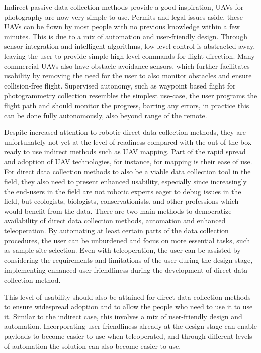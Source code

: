 Indirect passive data collection methods provide a good inspiration, UAVs for photography are now very simple to use. Permits and legal issues aside, these UAVs can be  flown by most people with no previous knowledge within a few minutes. This is due to a mix of automation and user-friendly design. Through sensor integration and intelligent algorithms, low level control is abstracted away, leaving the user to provide simple high level commands for flight direction. Many commercial UAVs also have obstacle avoidance sensors, which further facilitates usability by removing the need for the user to also monitor obstacles and ensure collision-free flight. Supervised autonomy, such as waypoint based flight for photogrammetry collection resembles the simplest use-case, the user programs the flight path and should monitor the progress, barring any errors, in practice this can be done fully autonomously, also beyond range of the remote.


Despite increased attention to robotic direct data collection methods, they are unfortunately not yet at the level of readiness compared with the out-of-the-box ready to use indirect methods such as UAV mapping.
Part of the rapid spread and adoption of UAV technologies, for instance, for mapping is their ease of use. For direct data collection methods to also be a viable data collection tool in the field, they also need to present enhanced usability, especially since increasingly the end-users in the field are not robotic experts eager to debug issues in the field, but ecologists, biologists, conservationists, and other professions which would benefit from the data. There are two main methods to democratize availability of direct data collection methods, automation and enhanced teleoperation. By automating at least certain parts of the data collection procedures, the user can be unburdened and focus on more essential tasks, such as sample site selection. Even with teleoperation, the user can be assisted by considering the requirements and limitations of the user during the design stage, implementing enhanced user-friendliness during the development of direct data collection method.

This level of usability should also be attained for direct data collection methods to ensure widespread adoption and to allow the people who need to use it to use it. Similar to the indirect case, this involves a mix of user-friendly design and automation. Incorporating user-friendliness already at the design stage can enable payloads to become easier to use when teleoperated, and through different levels of automation the solution can also become easier to use. 

